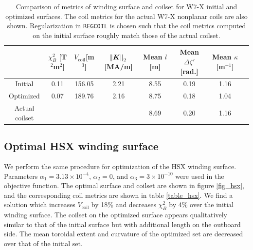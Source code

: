 \documentclass[aps,unsortedaddress]{revtex4-1}
\begin{document}
\begin{table}
\renewcommand{\arraystretch}{1.4}
\begin{tabular} {| c | c | c | c | c | c | c | c |}
\hline
& $\chi^2_B$ [T$^2$m$^2$] & $V_{\text{coil}}$[m$^3$] & $\norm{\bm{K}}_2$ [MA/m] & Mean $l$ [m] & Mean $\Delta \zeta'$ [rad.] & Mean $\kappa$ [m$^{-1}$]  \\ \hline 
Initial & 0.11 & 156.05 & 2.21 & 8.55 & 0.19 & 1.16 \\ \hline
Optimized & 0.07 & 189.76 & 2.16 & 8.75 & 0.18 & 1.04   \\ \hline
Actual coilset & & & & 8.69 & 0.20 & 1.16  \\ \hline
\end{tabular}
\caption{Comparison of metrics of winding surface and coilset for W7-X initial and optimized surfaces. The coil metrics for the actual W7-X nonplanar coils are also shown. Regularization in \texttt{REGCOIL} is chosen such that the coil metrics computed on the initial surface roughly match those of the actual coilset.}
\label{table_w7x}
\end{table}

\FloatBarrier
\subsection{Optimal HSX winding surface}
\FloatBarrier

We perform the same procedure for optimization of the HSX winding surface. Parameters $\alpha_1 = 3.13\times10^{-4}$, $\alpha_2 = 0$, and $\alpha_3 = 3\times 10^{-10}$ were used in the objective function. The optimal surface and coilset are shown in figure \ref{fig_hsx}, and the corresponding coil metrics are shown in table \ref{table_hsx}. We find a solution which increases $V_{\text{coil}}$ by 18\% and decreases $\chi^2_B$ by 4\% over the initial winding surface. The coilset on the optimized surface appears qualitatively similar to that of the initial surface but with additional length on the outboard side. The mean toroidal extent and curvature of the optimized set are decreased over that of the initial set. 
\end{document}
